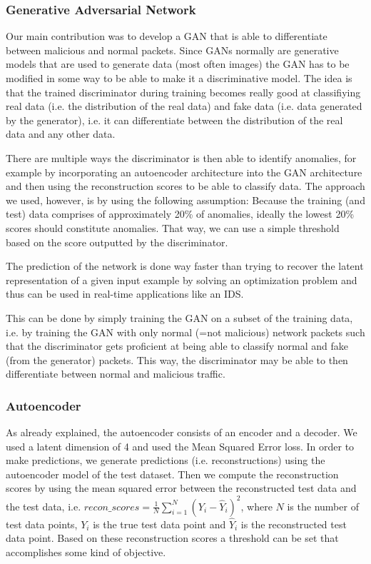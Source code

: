 \documentclass[]{article}
\begin{document}
	 
	 
	\subsubsection{Generative Adversarial Network}
	 Our main contribution was to develop a GAN that is able to differentiate between malicious and normal packets. Since GANs normally are generative models that are used to generate data (most often images) the GAN has to be modified in some way to be able to make it a discriminative model.  The idea is that the trained discriminator during training becomes really good at classifiying real data (i.e. the distribution of the real data) and fake data (i.e. data generated by the generator), i.e. it can differentiate between the distribution of the real data and any other data.
	 \newline
	 
	 \noindent
	 There are multiple ways the discriminator is then able to identify anomalies, for example by incorporating an autoencoder architecture into the GAN architecture and then using the reconstruction scores to be able to classify data. The approach we used, however, is by using the following assumption: Because the training (and test) data comprises of approximately 20\% of anomalies, ideally the lowest 20\% scores should constitute anomalies. That way, we can use a simple threshold based on the score outputted by the discriminator. 
	 
	 
	 The prediction of the network is done way faster than trying to recover the latent representation of a given input example by solving an optimization problem and thus can be used in real-time applications like an IDS.
	 \newline
	 
	 \noindent
	 This can be done by simply training the GAN on a subset of the training data, i.e. by training the GAN with only normal (=not malicious) network packets such that the discriminator gets proficient at being able to classify normal and fake (from the generator) packets. This way, the discriminator may be able to then differentiate between normal and malicious traffic. 
	 
     \subsubsection{Autoencoder}
     As already explained, the autoencoder consists of an encoder and a decoder. We used a latent dimension of 4 and used the Mean Squared Error loss. In order to make predictions, we generate predictions (i.e. reconstructions) using the autoencoder model of the test dataset. Then we compute the reconstruction scores by using the mean squared error between the reconstructed test data and the test data, i.e. $recon\_scores = \frac{1}{N} \sum_{i=1}^{N} (Y_i - \hat{Y}_i)^2$, where $N$ is the number of test data points, $Y_i$ is the true test data point and $\hat{Y}_i$ is the reconstructed test data point. Based on these reconstruction scores a threshold can be set that accomplishes some kind of objective.
     
\end{document}
